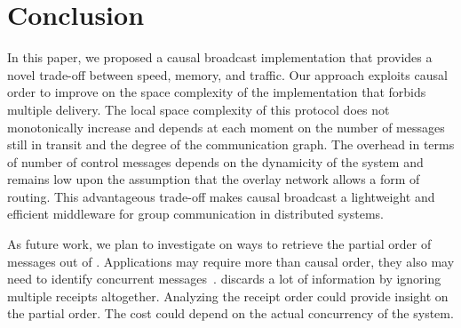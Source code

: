 
\section{Conclusion}
\label{sec:conclusion}


In this paper, we proposed a causal broadcast implementation that provides a
novel trade-off between speed, memory, and traffic.  Our approach exploits
causal order to improve on the space complexity of the implementation that
forbids multiple delivery.  The local space complexity of this protocol does not
monotonically increase and depends at each moment on the number of messages
still in transit and the degree of the communication graph.
The overhead in terms of number of control messages depends on the dynamicity of
the system and remains low upon the assumption that the overlay network allows a
form of routing.
This advantageous trade-off makes causal broadcast a lightweight and efficient
middleware for group communication in distributed systems. 

As future work, we plan to investigate on ways to retrieve the partial order of
messages out of \RPCBROADCAST. %
Applications may require more than causal order, they also may need to identify
concurrent messages~\cite{sun2009contextbased}. \RPCBROADCAST discards a lot of
information by ignoring multiple receipts altogether. Analyzing the receipt
order could provide insight on the partial order. The cost could depend on the
actual concurrency of the system.

